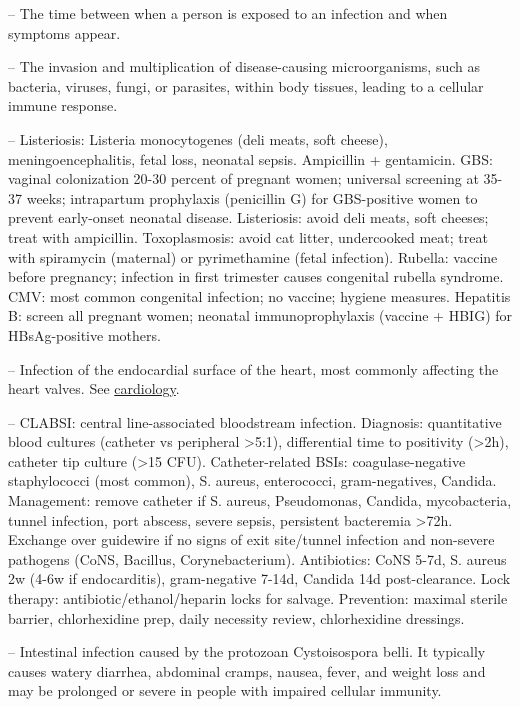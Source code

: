 -- The time between when a person is exposed to an infection and when symptoms appear.

-- The invasion and multiplication of disease-causing microorganisms, such as bacteria, viruses, fungi, or parasites, within body tissues, leading to a cellular immune response.

-- Listeriosis: Listeria monocytogenes (deli meats, soft cheese), meningoencephalitis, fetal loss, neonatal sepsis. Ampicillin + gentamicin. GBS: vaginal colonization 20-30 percent of pregnant women; universal screening at 35-37 weeks; intrapartum prophylaxis (penicillin G) for GBS-positive women to prevent early-onset neonatal disease. Listeriosis: avoid deli meats, soft cheeses; treat with ampicillin. Toxoplasmosis: avoid cat litter, undercooked meat; treat with spiramycin (maternal) or pyrimethamine (fetal infection). Rubella: vaccine before pregnancy; infection in first trimester causes congenital rubella syndrome. CMV: most common congenital infection; no vaccine; hygiene measures. Hepatitis B: screen all pregnant women; neonatal immunoprophylaxis (vaccine + HBIG) for HBsAg-positive mothers.

-- Infection of the endocardial surface of the heart, most commonly affecting the heart valves. See \hyperlink{Cardiology}{cardiology}.

-- CLABSI: central line-associated bloodstream infection. Diagnosis: quantitative blood cultures (catheter vs peripheral >5:1), differential time to positivity (>2h), catheter tip culture (>15 CFU). Catheter-related BSIs: coagulase-negative staphylococci (most common), S. aureus, enterococci, gram-negatives, Candida. Management: remove catheter if S. aureus, Pseudomonas, Candida, mycobacteria, tunnel infection, port abscess, severe sepsis, persistent bacteremia >72h. Exchange over guidewire if no signs of exit site/tunnel infection and non-severe pathogens (CoNS, Bacillus, Corynebacterium). Antibiotics: CoNS 5-7d, S. aureus 2w (4-6w if endocarditis), gram-negative 7-14d, Candida 14d post-clearance. Lock therapy: antibiotic/ethanol/heparin locks for salvage. Prevention: maximal sterile barrier, chlorhexidine prep, daily necessity review, chlorhexidine dressings.

-- Intestinal infection caused by the protozoan Cystoisospora belli. It typically causes watery diarrhea, abdominal cramps, nausea, fever, and weight loss and may be prolonged or severe in people with impaired cellular immunity.


